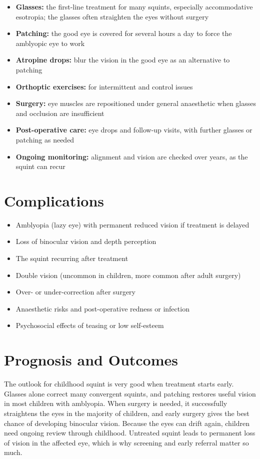 \begin{itemize}
    \item \textbf{Glasses:} the first-line treatment for many squints, especially accommodative esotropia; the glasses often straighten the eyes without surgery
    \item \textbf{Patching:} the good eye is covered for several hours a day to force the amblyopic eye to work
    \item \textbf{Atropine drops:} blur the vision in the good eye as an alternative to patching
    \item \textbf{Orthoptic exercises:} for intermittent and control issues
    \item \textbf{Surgery:} eye muscles are repositioned under general anaesthetic when glasses and occlusion are insufficient
    \item \textbf{Post-operative care:} eye drops and follow-up visits, with further glasses or patching as needed
    \item \textbf{Ongoing monitoring:} alignment and vision are checked over years, as the squint can recur
\end{itemize}

\section*{Complications}
\begin{itemize}
    \item Amblyopia (lazy eye) with permanent reduced vision if treatment is delayed
    \item Loss of binocular vision and depth perception
    \item The squint recurring after treatment
    \item Double vision (uncommon in children, more common after adult surgery)
    \item Over- or under-correction after surgery
    \item Anaesthetic risks and post-operative redness or infection
    \item Psychosocial effects of teasing or low self-esteem
\end{itemize}

\section*{Prognosis and Outcomes}
The outlook for childhood squint is very good when treatment starts early. Glasses alone correct many convergent squints, and patching restores useful vision in most children with amblyopia. When surgery is needed, it successfully straightens the eyes in the majority of children, and early surgery gives the best chance of developing binocular vision. Because the eyes can drift again, children need ongoing review through childhood. Untreated squint leads to permanent loss of vision in the affected eye, which is why screening and early referral matter so much.

